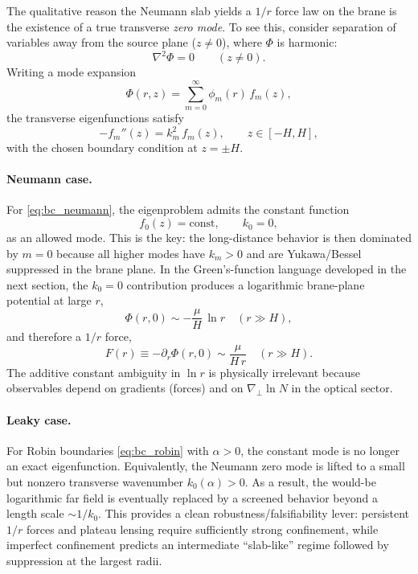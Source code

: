 \documentclass[11pt]{article}
\begin{document}
The qualitative reason the Neumann slab yields a $1/r$ force law on the brane is the existence of a
true transverse \emph{zero mode}.
To see this, consider separation of variables away from the source plane ($z\neq 0$), where
$\Phi$ is harmonic:
\begin{equation}
  \nabla^2 \Phi = 0 \qquad (z\neq 0).
\end{equation}
Writing a mode expansion
\begin{equation}
  \Phi(r,z) = \sum_{m=0}^\infty \phi_m(r)\,f_m(z),
  \label{eq:mode_ansatz}
\end{equation}
the transverse eigenfunctions satisfy
\begin{equation}
  -f_m''(z) = k_m^2\,f_m(z),
  \qquad z\in[-H,H],
  \label{eq:transverse_eigenproblem}
\end{equation}
with the chosen boundary condition at $z=\pm H$.

\paragraph{Neumann case.}
For \eqref{eq:bc_neumann}, the eigenproblem admits the constant function
\begin{equation}
  f_0(z) = \text{const},\qquad k_0=0,
\end{equation}
as an allowed mode.  This is the key: the long-distance behavior is then dominated by $m=0$ because
all higher modes have $k_m>0$ and are Yukawa/Bessel suppressed in the brane plane.
In the Green's-function language developed in the next section, the $k_0=0$ contribution produces a
logarithmic brane-plane potential at large $r$,
\begin{equation}
  \Phi(r,0) \sim -\frac{\mu}{H}\,\ln r \quad (r\gg H),
\end{equation}
and therefore a $1/r$ force,
\begin{equation}
  F(r)\equiv-\partial_r\Phi(r,0)\sim \frac{\mu}{H\,r}\quad (r\gg H).
\end{equation}
The additive constant ambiguity in $\ln r$ is physically irrelevant because observables depend on
gradients (forces) and on $\nabla_\perp \ln N$ in the optical sector.

\paragraph{Leaky case.}
For Robin boundaries \eqref{eq:bc_robin} with $\alpha>0$, the constant mode is no longer an exact
eigenfunction.  Equivalently, the Neumann zero mode is lifted to a small but nonzero transverse
wavenumber $k_0(\alpha)>0$.
As a result, the would-be logarithmic far field is eventually replaced by a screened behavior beyond
a length scale $\sim 1/k_0$.
This provides a clean robustness/falsifiability lever: persistent $1/r$ forces and plateau lensing
require sufficiently strong confinement, while imperfect confinement predicts an intermediate
``slab-like'' regime followed by suppression at the largest radii.
\end{document}
